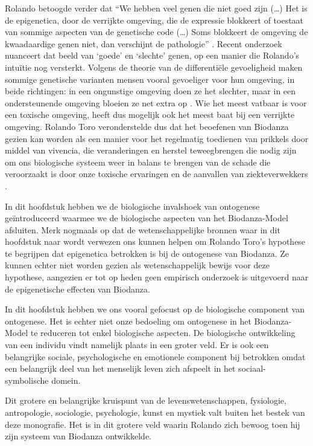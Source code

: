 \documentclass[
  11pt,
]{book}
\begin{document}
Rolando betoogde verder dat ``We hebben veel genen die niet goed zijn (\ldots) Het is de epigenetica, door de verrijkte omgeving, die de expressie blokkeert of toestaat van sommige aspecten van de genetische code (\ldots) Soms blokkeert de omgeving de kwaadaardige genen niet, dan verschijnt de pathologie'' \citep{Montanari2023}. Recent onderzoek nuanceert dat beeld van `goede' en `slechte' genen, op een manier die Rolando's intuïtie nog versterkt. Volgens de theorie van de differentiële gevoeligheid maken sommige genetische varianten mensen vooral gevoeliger voor hun omgeving, in beide richtingen: in een ongunstige omgeving doen ze het slechter, maar in een ondersteunende omgeving bloeien ze net extra op \citep{Belsky2009}. Wie het meest vatbaar is voor een toxische omgeving, heeft dus mogelijk ook het meest baat bij een verrijkte omgeving. Rolando Toro veronderstelde dus dat het beoefenen van Biodanza gezien kan worden als een manier voor het regelmatig toedienen van prikkels door middel van vivencia, die veranderingen en herstel teweegbrengen die nodig zijn om ons biologische systeem weer in balans te brengen van de schade die veroorzaakt is door onze toxische ervaringen en de aanvallen van ziekteverwekkers \citep{Montanari2023}.

In dit hoofdstuk hebben we de biologische invalshoek van ontogenese geïntroduceerd waarmee we de biologische aspecten van het Biodanza-Model afsluiten.
Merk nogmaals op dat de wetenschappelijke bronnen waar in dit hoofdstuk naar wordt verwezen ons kunnen helpen om Rolando Toro's hypothese te begrijpen dat epigenetica betrokken is bij de ontogenese van Biodanza. Ze kunnen echter niet worden gezien als wetenschappelijk bewijs voor deze hypothese, aangezien er tot op heden geen empirisch onderzoek is uitgevoerd naar de epigenetische effecten van Biodanza.

In dit hoofdstuk hebben we ons vooral gefocust op de biologische component van ontogenese. Het is echter niet onze bedoeling om ontogenese in het Biodanza-Model te reduceren tot enkel biologische aspecten. De biologische ontwikkeling van een individu vindt namelijk plaats in een groter veld. Er is ook een belangrijke sociale, psychologische en emotionele component bij betrokken omdat een belangrijk deel van het menselijk leven zich afspeelt in het sociaal-symbolische domein.

Dit grotere en belangrijke kruispunt van de levenswetenschappen, fysiologie, antropologie, sociologie, psychologie, kunst en mystiek valt buiten het bestek van deze monografie. Het is in dit grotere veld waarin Rolando zich bewoog toen hij zijn systeem van Biodanza ontwikkelde.
\end{document}
